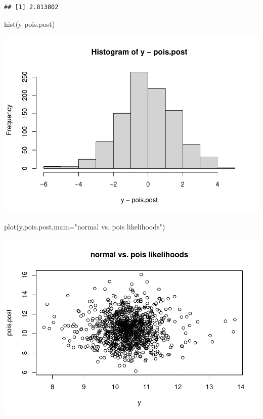 \documentclass[
]{book}
\newenvironment{Shaded}{\begin{snugshade}}{\end{snugshade}}
\newcommand{\AttributeTok}[1]{\textcolor[rgb]{0.77,0.63,0.00}{#1}}
\newcommand{\FunctionTok}[1]{\textcolor[rgb]{0.00,0.00,0.00}{#1}}
\newcommand{\NormalTok}[1]{#1}
\newcommand{\SpecialCharTok}[1]{\textcolor[rgb]{0.00,0.00,0.00}{#1}}
\newcommand{\StringTok}[1]{\textcolor[rgb]{0.31,0.60,0.02}{#1}}
\theoremstyle{definition}
\theoremstyle{definition}
\theoremstyle{definition}
\theoremstyle{definition}
\theoremstyle{remark}
\begin{document}
\begin{verbatim}
## [1] 2.813802
\end{verbatim}

\begin{Shaded}
\begin{Highlighting}[]
 \FunctionTok{hist}\NormalTok{(y}\SpecialCharTok{{-}}\NormalTok{pois.post)}
\end{Highlighting}
\end{Shaded}

\includegraphics{_main_files/figure-latex/unnamed-chunk-41-1.pdf}

\begin{Shaded}
\begin{Highlighting}[]
 \FunctionTok{plot}\NormalTok{(y,pois.post,}\AttributeTok{main=}\StringTok{"normal vs. pois likelihoods"}\NormalTok{)}
\end{Highlighting}
\end{Shaded}

\includegraphics{_main_files/figure-latex/unnamed-chunk-41-2.pdf}
\end{document}
